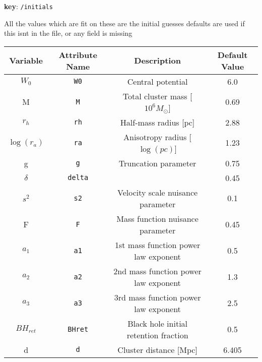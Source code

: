 
\textbf{key}: \texttt{/initials}

All the values which are fit on
these are the initial guesses
defaults are used if this isnt in the file, or any field is missing


\begin{center}
\begin{tabular}{ | c | c | c | c | }
    \hline
    Variable & Attribute Name & Description & Default Value \\
    \hline\hline
    \(W_0\) & \texttt{W0} & Central potential & 6.0 \\
    \hline
    M & \texttt{M} & Total cluster mass [\(10^6 M_{\odot}\)] & 0.69 \\
    \hline
    \(r_h\) & \texttt{rh} & Half-mass radius [pc] & 2.88 \\
    \hline
    \(\log(r_a)\) & \texttt{ra} & Anisotropy radius [\(\log(pc)\)] & 1.23 \\
    \hline
    g & \texttt{g} & Truncation parameter & 0.75 \\
    \hline
    \(\delta\) & \texttt{delta} & & 0.45 \\
    \hline
    \(s^2\) & \texttt{s2} & Velocity scale nuisance parameter & 0.1 \\
    \hline
    F & \texttt{F} & Mass function nuisance parameter & 0.45 \\
    \hline
    \(a_1\) & \texttt{a1} & 1st mass function power law exponent & 0.5 \\
    \hline
    \(a_2\) & \texttt{a2} & 2nd mass function power law exponent & 1.3 \\
    \hline
    \(a_3\) & \texttt{a3} & 3rd mass function power law exponent & 2.5 \\
    \hline
    \(BH_{ret}\)&\texttt{BHret} & Black hole initial retention fraction & 0.5 \\
    \hline
    d & \texttt{d} & Cluster distance [Mpc] & 6.405 \\
    \hline
\end{tabular}
\end{center}